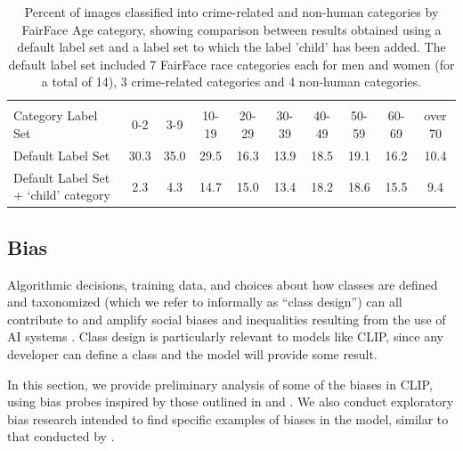 \documentclass{article}
\begin{document}
\begin{table}[t]
\vskip 0.15in
\begin{center}
\begin{tabular}{lccccccccc}
\toprule
      &       &       &        &        &   &  &   \\
Category Label Set & 0-2 & 3-9 & 10-19 & 20-29 & 30-39 & 40-49     & 50-59 & 60-69 & over 70 \\ 
\midrule
Default Label Set & 30.3 & 35.0 & 29.5 & 16.3 & 13.9 & 18.5 & 19.1 & 16.2 & 10.4 \\
Default Label Set + `child' category & 2.3 & 4.3 & 14.7 & 15.0 & 13.4 & 18.2 & 18.6 & 15.5 & 9.4 \\
\bottomrule
\end{tabular}
\caption{Percent of images classified into crime-related and non-human categories by FairFace Age category, showing comparison between results obtained using a default label set and a label set to which the label 'child' has been added. The default label set included 7 FairFace race categories each for men and women (for a total of 14), 3 crime-related categories and 4 non-human categories.}
\label{age_bias_table}
\end{center}
\vskip -0.1in
\end{table}



\subsection{Bias}
Algorithmic decisions, training data, and choices about how classes are defined and taxonomized (which we refer to informally as ``class design'') can all contribute to and amplify social biases and inequalities resulting from the use of  AI systems \citep{Noble2018, Bechmann2019, bowker2000sorting}. Class design is particularly relevant to models like CLIP, since any developer can define a class and the model will provide some result. 

In this section, we provide preliminary analysis of some of the biases in CLIP, using bias probes inspired by those outlined in \citet{buolamwini2018gendershades} and \citet{1908.04913}. We also conduct exploratory bias research intended to find specific examples of biases in the model, similar to that conducted by \citet{1908.09203}. 
\end{document}
